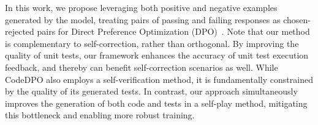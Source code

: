 
In this work, we propose leveraging both positive and negative examples generated by the model, treating pairs of passing and failing responses as chosen-rejected pairs for Direct Preference Optimization (DPO)~\cite{rafailov2024direct}. Note that our method is complementary to self-correction, rather than orthogonal. By improving the quality of unit tests, our framework enhances the accuracy of unit test execution feedback, and thereby can benefit self-correction scenarios as well. While CodeDPO also employs a self-verification method, it is fundamentally constrained by the quality of its generated tests. In contrast, our approach simultaneously improves the generation of both code and tests in a self-play method, mitigating this bottleneck and enabling more robust training.
